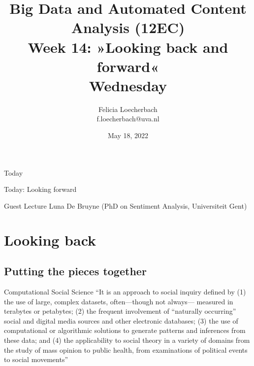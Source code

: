 

\graphicspath{{../../resources/img/}}




\title[Big Data and Automated Content Analysis]{\textbf{Big Data and Automated Content Analysis (12EC)} 
\\Week 14: »Looking back and forward«
\\Wednesday}
\author[Felicia Loecherbach]{Felicia Loecherbach\\ \footnotesize{f.loecherbach@uva.nl \\}}
\date{May 18, 2022}


\begin{frame}{}
	\titlepage
\end{frame}

\begin{frame}{Today}
	\tableofcontents
\end{frame}


\begin{frame}[standout]
Today: Looking forward
\end{frame}


\begin{frame}[standout]
Guest Lecture Luna De Bruyne
(PhD on Sentiment Analysis, Universiteit Gent)
\end{frame}










\section{Looking back}
\subsection{Putting the pieces together}


\begin{frame}{Computational Social Science \parencite{Shah2015}}
	``It is an approach to social inquiry defined by (1) the use of large, complex datasets, often—though not always— measured in terabytes or petabytes; (2) the frequent involvement of “naturally occurring” social and digital media sources and other electronic databases; (3) the use of computational or algorithmic solutions to generate patterns and inferences from these data; and (4) the applicability to social theory in a variety of domains from the study of mass opinion to public health, from examinations of political events to social movements''
\end{frame}





